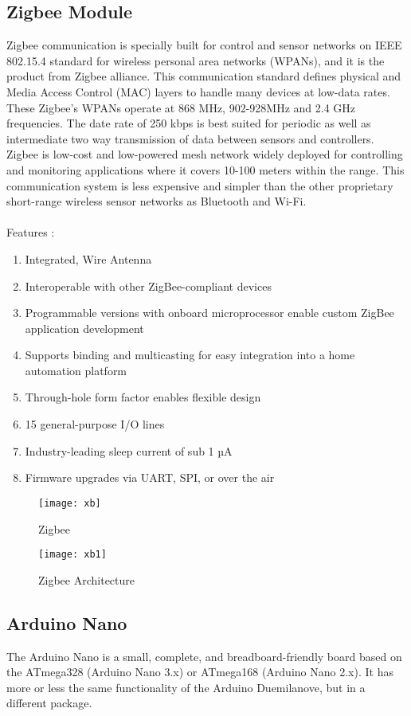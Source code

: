 \documentclass[12pt,a4paper]{report}
\begin{document}
\subsection{Zigbee Module}

\hspace*{1cm}Zigbee communication is specially built for control and sensor networks on IEEE 802.15.4 standard for wireless personal area networks (WPANs), and it is the product from Zigbee alliance. This communication standard defines physical and Media Access Control (MAC) layers to handle many devices at low-data rates. These Zigbee’s WPANs operate at 868 MHz, 902-928MHz and 2.4 GHz frequencies. The date rate of 250 kbps is best suited for periodic as well as intermediate two way transmission of data between sensors and controllers.
Zigbee is low-cost and low-powered mesh network widely deployed for controlling and monitoring applications where it covers 10-100 meters within the range. This communication system is less expensive and simpler than the other proprietary short-range wireless sensor networks  as Bluetooth and Wi-Fi.\\\\
Features :
\begin{enumerate}
\item Integrated, Wire Antenna
\item Interoperable with other ZigBee-compliant devices
\item Programmable versions with onboard microprocessor enable custom ZigBee application development
\item Supports binding and multicasting for easy integration into a home automation platform
\item Through-hole form factor enables flexible design
\item 15 general-purpose I/O lines
\item Industry-leading sleep current of sub 1 µA
\item Firmware upgrades via UART, SPI, or over the air
\end{enumerate}
\begin{figure}
\centering
\texttt{[image: xb]}
\caption{Zigbee}
\label{circuit}
\end{figure}

\begin{figure}
\centering
\texttt{[image: xb1]}
\caption{Zigbee Architecture}
\label{circuit}
\end{figure}
\newpage
\subsection{Arduino Nano}
\hspace*{1cm}The Arduino Nano is a small, complete, and breadboard-friendly board based on the ATmega328 (Arduino Nano 3.x) or ATmega168 (Arduino Nano 2.x). It has more or less the same functionality of the Arduino Duemilanove, but in a different package.
\end{document}
